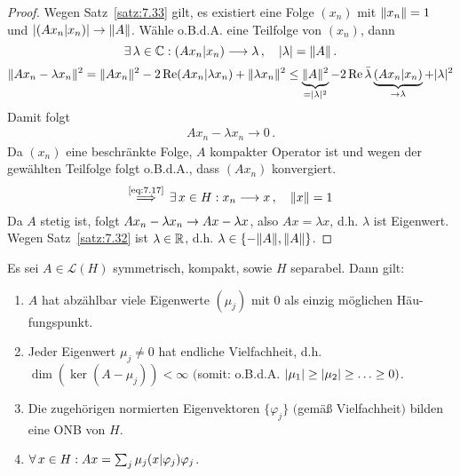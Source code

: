 \begin{proof}
Wegen Satz~\ref{satz:7.33} gilt, es existiert eine Folge $(x_n)$ mit $\lVert x_n\rVert = 1$ und $\lvert (Ax_n\vert x_n)\rvert \rightarrow \lVert A\rVert$. Wähle o.B.d.A. eine Teilfolge von $(x_n)$, dann 
\[
	\exists \, \lambda \in \mathbb{C} : (Ax_n \vert x_n) \longrightarrow \lambda \, , \quad \lvert \lambda\rvert = \lVert A\rVert \, .
\]
\begin{dmath*}
	\norm{Ax_n - \lambda x_n}^2 = \norm{Ax_n}^2 - 2 \Re (Ax_n\vert \lambda x_n) + \norm{\lambda x_n}^2 \leq \underbrace{\norm A^2}_{=\abs\lambda^2} - 2 \Re \bar\lambda \underbrace{(Ax_n \vert x_n)}_{\ra \lambda} + \abs \lambda^2
\end{dmath*}
Damit folgt 
\begin{align}
\label{eq:7.17}	Ax_n - \lambda x_n \longrightarrow 0 \, .
\end{align}
Da $(x_n)$ eine beschränkte Folge, $A$ kompakter Operator ist und wegen der gewählten Teilfolge folgt o.B.d.A., dass $(Ax_n)$ konvergiert.
\[
	\stackrel{\scriptsize\eqref{eq:7.17}}\Longrightarrow	 \, \exists \, x \in H : x_n \longrightarrow x \, , \quad \lVert x\rVert = 1 
\]
Da $A$ stetig ist, folgt $Ax_n - \lambda x_n \rightarrow Ax - \lambda x$, also $Ax = \lambda x$, d.h. $\lambda$ ist  Eigenwert. Wegen Satz~\ref{satz:7.32} ist $\lambda \in \mathbb{R}$, d.h. $\lambda \in \{-\lVert A\rVert, \lVert A\rVert\}$.
\end{proof}


\begin{theorem}\label{theorem:7.35}
Es sei $A \in \mathcal L(H)$ symmetrisch, kompakt, sowie $H$ separabel. Dann gilt:
\begin{enumerate}[\rm (i)]
\item $A$ hat abzählbar viele Eigenwerte $(\mu_j)$ mit $0$ als einzig möglichen Häu-fungspunkt.
\item Jeder Eigenwert $\mu_j \neq 0$ hat endliche Vielfachheit, d.h. $\dim (\ker (A-\mu_j)) < \infty$ $($somit: o.B.d.A. $\lvert \mu_1\rvert \geq \lvert \mu_2\rvert \geq \ldots \geq 0)$.
\item Die zugehörigen normierten Eigenvektoren $\{\varphi_j\}$ $($gemäß Vielfachheit$)$ bilden eine ONB von $H$.
\item $\forall \, x \in H : Ax = \sum_j \mu_j (x\vert \varphi_j) \varphi_j$.
\end{enumerate}
\end{theorem}

